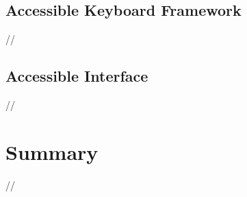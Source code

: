 \subsection{Accessible Keyboard Framework}
//

\subsection{Accessible Interface}
//


\section{Summary}  %
//
